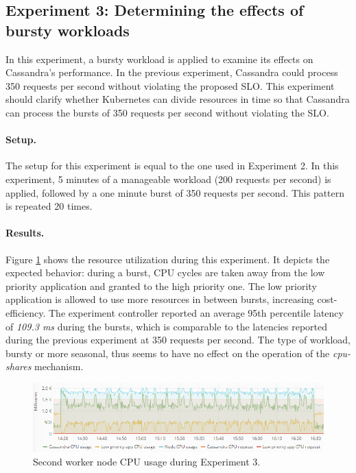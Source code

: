 \subsection{Experiment 3: Determining the effects of bursty workloads}
In this experiment, a bursty workload is applied to examine its effects on Cassandra's performance. In the previous experiment, Cassandra could process 350 requests per second without violating the proposed SLO. This experiment should clarify whether Kubernetes can divide resources in time so that Cassandra can process the bursts of 350 requests per second without violating the SLO.

\paragraph{Setup.}
The setup for this experiment is equal to the one used in Experiment 2. In this experiment, 5 minutes of a manageable workload (200 requests per second) is applied, followed by a one minute burst of 350 requests per second. This pattern is repeated 20 times.  

\paragraph{Results.}
Figure \ref{fig:cpu-cas-lpp-bursty} shows the resource utilization during this experiment. It depicts the expected behavior: during a burst, CPU cycles are taken away from the low priority application and granted to the high priority one. The low priority application is allowed to use more resources in between bursts, increasing cost-efficiency. The experiment controller reported an average 95th percentile latency of \textit{109.3 ms} during the bursts, which is comparable to the latencies reported during the previous experiment at 350 requests per second. The type of workload, bursty or more seasonal, thus seems to have no effect on the operation of the \textit{cpu-shares} mechanism. 

\begin{figure}
\centering
\includegraphics[width=\columnwidth]{Images/Experiments/CPU/Grafana/cpu-cas-lpp-bursty.PNG}
\caption{Second worker node CPU usage during Experiment 3.}
\label{fig:cpu-cas-lpp-bursty}
\end{figure}

